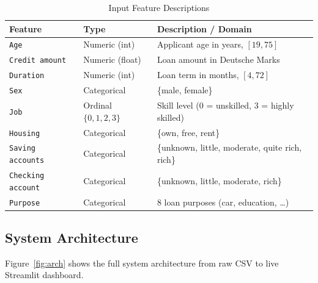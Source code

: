 \documentclass[12pt,a4paper]{article}
\theoremstyle{definition}
\newcommand{\code}[1]{\texttt{#1}}
\begin{document}
\begin{table}[H]
  \centering
  \caption{Input Feature Descriptions}
  \label{tab:features}
  \begin{tabularx}{\linewidth}{llX}
    \toprule
    \textbf{Feature}          & \textbf{Type}       & \textbf{Description / Domain} \\
    \midrule
    \code{Age}                & Numeric (int)       & Applicant age in years, $[19, 75]$ \\
    \code{Credit amount}      & Numeric (float)     & Loan amount in Deutsche Marks \\
    \code{Duration}           & Numeric (int)       & Loan term in months, $[4, 72]$ \\
    \code{Sex}                & Categorical         & \{male, female\} \\
    \code{Job}                & Ordinal $\{0,1,2,3\}$ & Skill level (0 = unskilled, 3 = highly skilled) \\
    \code{Housing}            & Categorical         & \{own, free, rent\} \\
    \code{Saving accounts}    & Categorical         & \{unknown, little, moderate, quite rich, rich\} \\
    \code{Checking account}   & Categorical         & \{unknown, little, moderate, rich\} \\
    \code{Purpose}            & Categorical         & 8 loan purposes (car, education, \ldots) \\
    \bottomrule
  \end{tabularx}
\end{table}

\subsection{System Architecture}
\label{sec:arch}

Figure~\ref{fig:arch} shows the full system architecture from raw CSV to live
Streamlit dashboard.
\end{document}
